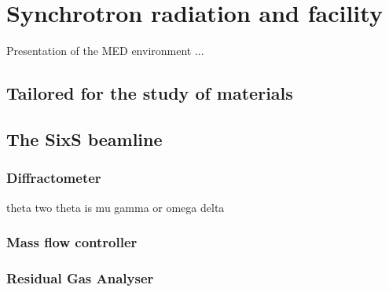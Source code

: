 \section{Synchrotron radiation and facility} \label{sec:SIXS}

Presentation of the MED environment ... 

\subsection{Tailored for the study of materials}

\subsection{The SixS beamline}

\subsubsection{Diffractometer}
theta two theta is mu gamma or omega delta

\subsubsection{Mass flow controller}

\subsubsection{Residual Gas Analyser}

